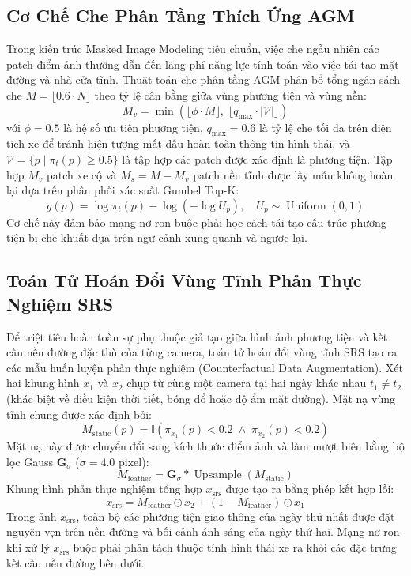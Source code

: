 \documentclass[11pt,a4paper]{article}
\begin{document}
\subsection{Cơ Chế Che Phân Tầng Thích Ứng AGM}
Trong kiến trúc Masked Image Modeling tiêu chuẩn, việc che ngẫu nhiên các patch điểm ảnh thường dẫn đến lãng phí năng lực tính toán vào việc tái tạo mặt đường và nhà cửa tĩnh. Thuật toán che phân tầng AGM phân bổ tổng ngân sách che $M = \lfloor 0.6 \cdot N \rfloor$ theo tỷ lệ cân bằng giữa vùng phương tiện và vùng nền:
\begin{equation}
    M_v = \min\left( \lfloor \phi \cdot M \rfloor, \; \lfloor q_{\max} \cdot |\mathcal{V}| \rfloor \right)
\end{equation}
với $\phi = 0.5$ là hệ số ưu tiên phương tiện, $q_{\max} = 0.6$ là tỷ lệ che tối đa trên diện tích xe để tránh hiện tượng mất dấu hoàn toàn thông tin hình thái, và $\mathcal{V} = \{p \mid \pi_t(p) \ge 0.5\}$ là tập hợp các patch được xác định là phương tiện.
Tập hợp $M_v$ patch xe cộ và $M_s = M - M_v$ patch nền tĩnh được lấy mẫu không hoàn lại dựa trên phân phối xác suất Gumbel Top-K:
\begin{equation}
    g(p) = \log \pi_t(p) - \log(-\log U_p), \quad U_p \sim \operatorname{Uniform}(0, 1)
\end{equation}
Cơ chế này đảm bảo mạng nơ-ron buộc phải học cách tái tạo cấu trúc phương tiện bị che khuất dựa trên ngữ cảnh xung quanh và ngược lại.

\subsection{Toán Tử Hoán Đổi Vùng Tĩnh Phản Thực Nghiệm SRS}
Để triệt tiêu hoàn toàn sự phụ thuộc giả tạo giữa hình ảnh phương tiện và kết cấu nền đường đặc thù của từng camera, toán tử hoán đổi vùng tĩnh SRS tạo ra các mẫu huấn luyện phản thực nghiệm (Counterfactual Data Augmentation).
Xét hai khung hình $x_1$ và $x_2$ chụp từ cùng một camera tại hai ngày khác nhau $t_1 \ne t_2$ (khác biệt về điều kiện thời tiết, bóng đổ hoặc độ ẩm mặt đường). Mặt nạ vùng tĩnh chung được xác định bởi:
\begin{equation}
    M_{\text{static}}(p) = \mathbb{I}\left(\pi_{x_1}(p) < 0.2 \;\land\; \pi_{x_2}(p) < 0.2\right)
\end{equation}
Mặt nạ này được chuyển đổi sang kích thước điểm ảnh và làm mượt biên bằng bộ lọc Gauss $\mathbf{G}_\sigma$ ($\sigma = 4.0\text{ pixel}$):
\begin{equation}
    M_{\text{feather}} = \mathbf{G}_\sigma * \operatorname{Upsample}(M_{\text{static}})
\end{equation}
Khung hình phản thực nghiệm tổng hợp $x_{\text{srs}}$ được tạo ra bằng phép kết hợp lồi:
\begin{equation}
    x_{\text{srs}} = M_{\text{feather}} \odot x_2 + (1 - M_{\text{feather}}) \odot x_1
\end{equation}
Trong ảnh $x_{\text{srs}}$, toàn bộ các phương tiện giao thông của ngày thứ nhất được đặt nguyên vẹn trên nền đường và bối cảnh ánh sáng của ngày thứ hai. Mạng nơ-ron khi xử lý $x_{\text{srs}}$ buộc phải phân tách thuộc tính hình thái xe ra khỏi các đặc trưng kết cấu nền đường bên dưới.
\end{document}
